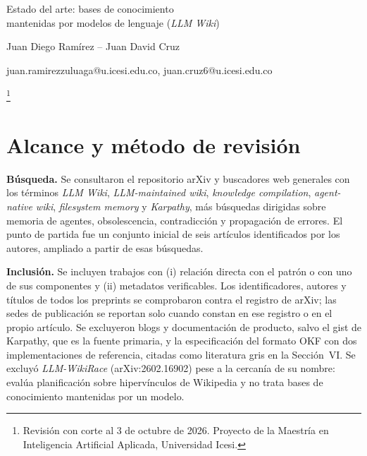 \documentclass[11pt,letterpaper]{article}
\newcommand{\notasinmarca}[1]{%
  \begingroup\renewcommand{\thefootnote}{}\footnote{#1}\addtocounter{footnote}{-1}\endgroup}
\begin{document}
\thispagestyle{fancy}

\begin{center}
{\LARGE Estado del arte: bases de conocimiento\\[2pt]
mantenidas por modelos de lenguaje (\emph{LLM Wiki})\par}
\vspace{18pt}
{\large Juan Diego Ramírez -- Juan David Cruz\par}
\vspace{4pt}
{\ttfamily\small juan.ramirezzuluaga@u.icesi.edu.co, juan.cruz6@u.icesi.edu.co\par}
\end{center}

\vspace{14pt}

\notasinmarca{Revisión con corte al 3 de octubre de 2026. Proyecto de la Maestría en Inteligencia Artificial Aplicada, Universidad Icesi.}


\section{Alcance y método de revisión}

\textbf{Búsqueda.} Se consultaron el repositorio arXiv y buscadores web generales con los términos \emph{LLM Wiki}, \emph{LLM-maintained wiki}, \emph{knowledge compilation}, \emph{agent-native wiki}, \emph{filesystem memory} y \emph{Karpathy}, más búsquedas dirigidas sobre memoria de agentes, obsolescencia, contradicción y propagación de errores. El punto de partida fue un conjunto inicial de seis artículos identificados por los autores, ampliado a partir de esas búsquedas.

\textbf{Inclusión.} Se incluyen trabajos con (i) relación directa con el patrón o con uno de sus componentes y (ii) metadatos verificables. Los identificadores, autores y títulos de todos los preprints se comprobaron contra el registro de arXiv; las sedes de publicación se reportan solo cuando constan en ese registro o en el propio artículo. Se excluyeron blogs y documentación de producto, salvo el gist de Karpathy, que es la fuente primaria, y la especificación del formato OKF con dos implementaciones de referencia, citadas como literatura gris en la Sección~VI. Se excluyó \emph{LLM-WikiRace} (arXiv:2602.16902) pese a la cercanía de su nombre: evalúa planificación sobre hipervínculos de Wikipedia y no trata bases de conocimiento mantenidas por un modelo.
\end{document}
